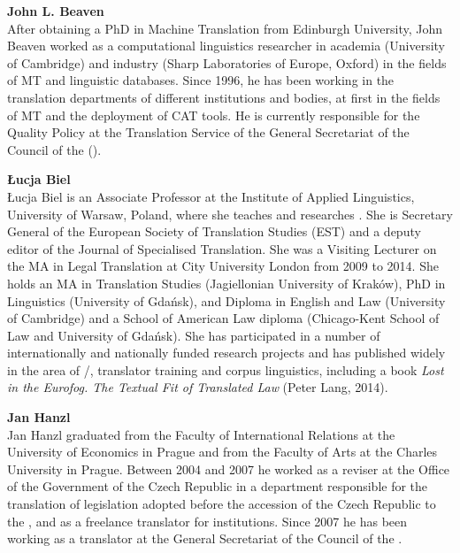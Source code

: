 \noindent
\textbf{John L. Beaven}\\
After obtaining a PhD in Machine Translation from Edinburgh University, John Beaven worked as a computational linguistics researcher in academia (University of Cambridge) and industry (Sharp Laboratories of Europe, Oxford) in the fields of MT and linguistic databases. Since 1996, he has been working in the translation departments of different  institutions and bodies, at first in the fields of MT and the deployment of CAT tools. He is currently responsible for the Quality Policy at the Translation Service of the General Secretariat of the Council of the  ().

\medskip\noindent
\textbf{Łucja Biel}\\
Łucja Biel is an Associate Professor at the Institute of Applied Linguistics, University of Warsaw, Poland, where she teaches and researches . She is Secretary General of the European Society of Translation Studies (EST) and a deputy editor of the Journal of Specialised Translation. She was a Visiting Lecturer on the MA in Legal Translation at City University London from 2009 to 2014. She holds an MA in Translation Studies (Jagiellonian University of Kraków), PhD in Linguistics (University of Gdańsk), and Diploma in English and  Law (University of Cambridge) and a School of American Law diploma (Chicago-Kent School of Law and University of Gdańsk). She has participated in a number of internationally and nationally funded research projects and has published widely in the area of /, translator training and corpus linguistics, including a book\textit{ Lost in the Eurofog. The Textual Fit of Translated Law} (Peter Lang, 2014).

\medskip\noindent
\textbf{Jan Hanzl}\\
Jan Hanzl graduated from the Faculty of International Relations at the University of Economics in Prague and from the Faculty of Arts at the Charles University in Prague. Between 2004 and 2007 he worked as a reviser at the Office of the Government of the Czech Republic in a department responsible for the translation of  legislation adopted before the accession of the Czech Republic to the , and as a freelance translator for  institutions. Since 2007 he has been working as a translator at the General Secretariat of the Council of the .

